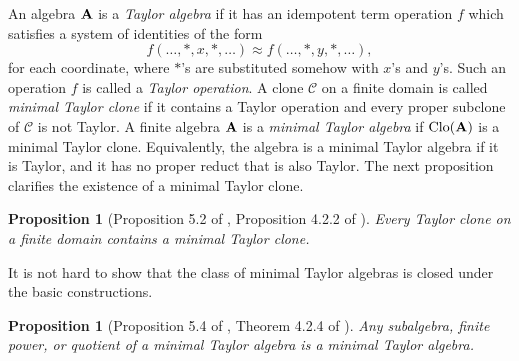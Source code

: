 \documentclass[11pt]{amsart}
\newcommand{\m}[1]{\mathbf{\uppercase{#1}}}
\newtheorem{prp}[thm]{Proposition}
\theoremstyle{definition}
\theoremstyle{remark}
\theoremstyle{plain}
\begin{document}
An algebra $\m a$ is a \emph{Taylor algebra} if it has an idempotent term operation $f$ which satisfies a system of identities of the form $$f(\dots,\ast,x,\ast,\dots )\approx f(\dots,\ast,y,\ast,\dots ),$$ for each coordinate, where $\ast$'s are substituted somehow with $x$'s and $y$'s. Such an operation $f$ is called a \emph{Taylor operation}.
A clone $\mathcal{C}$ on a finite domain is called \emph{minimal Taylor clone} if it contains a Taylor operation and every proper subclone of $\mathcal{C}$ is not Taylor. A finite algebra $\m a$ is a \emph{minimal Taylor algebra} if $\mathrm{Clo}(\m a)$ is a minimal Taylor clone. Equivalently, the algebra is a minimal Taylor algebra if it is Taylor, and it has no proper reduct that is also Taylor. The next proposition clarifies the existence of a minimal Taylor clone.


\begin{prp}[Proposition 5.2 of \cite{dreamteam}, Proposition 4.2.2 of \cite{Zebnotes}]
Every Taylor clone on a finite domain contains a minimal Taylor clone.
\end{prp}

It is not hard to show that the class of minimal Taylor algebras is closed under the basic constructions.

\begin{prp}[Proposition 5.4 of \cite{dreamteam}, Theorem 4.2.4 of \cite{Zebnotes}]\label{HSPfin}
Any subalgebra, finite power, or quotient of a minimal Taylor algebra is a minimal Taylor algebra.
\end{prp}
\end{document}
